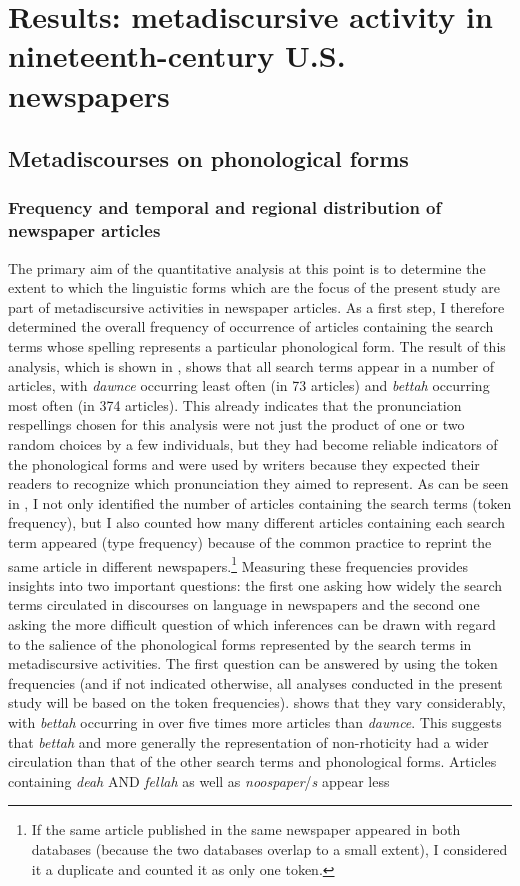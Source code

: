 \chapter{Results: metadiscursive activity in nineteenth-century U.S. newspapers}
\label{bkm:Ref523404731}\hypertarget{Toc63021232}{}\section{Metadiscourses on phonological forms}
\label{bkm:Ref13472461}\hypertarget{Toc63021233}{}\subsection{Frequency and temporal and regional distribution of newspaper articles}
\label{bkm:Ref6214186}\hypertarget{Toc63021234}{}
The primary aim of the quantitative analysis at this point is to determine the extent to which the linguistic forms which are the focus of the present study are part of metadiscursive activities in newspaper articles. As a first step, I therefore determined the overall frequency of occurrence of articles containing the search terms whose spelling represents a particular phonological form. The result of this analysis, which is shown in , shows that all search terms appear in a number of articles, with \emph{dawnce} occurring least often (in 73 articles) and \emph{bettah} occurring most often (in 374 articles). This already indicates that the pronunciation respellings chosen for this analysis were not just the product of one or two random choices by a few individuals, but they had become reliable indicators of the phonological forms and were used by writers because they expected their readers to recognize which pronunciation they aimed to represent. As can be seen in , I not only identified the number of articles containing the search terms (token frequency), but I also counted how many different articles containing each search term appeared (type frequency) because of the common practice to reprint the same article in different newspapers.\footnote{If the same article published in the same newspaper appeared in both databases (because the two databases overlap to a small extent), I considered it a duplicate and counted it as only one token.}  Measuring these frequencies provides insights into two important questions: the first one asking how widely the search terms circulated in discourses on language in newspapers and the second one asking the more difficult question of which inferences can be drawn with regard to the salience of the phonological forms represented by the search terms in metadiscursive activities. The first question can be answered by using the token frequencies (and if not indicated otherwise, all analyses conducted in the present study will be based on the token frequencies).  shows that they vary considerably, with \emph{bettah} occurring in over five times more articles than \emph{dawnce}. This suggests that \emph{bettah} and more generally the representation of non-rhoticity had a wider circulation than that of the other search terms and phonological forms. Articles containing \emph{deah} AND \emph{fellah} as well as \emph{noospaper}/\emph{s} appear less 